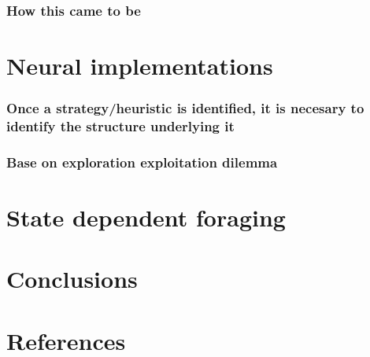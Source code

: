 \documentclass[11pt]{article}
\begin{document}
\subsubsection{How this came to be}
\label{sec:org9a89bb2}
\newpage
\section{Neural implementations}
\label{sec:orgb71928e}
\subsubsection{Once a strategy/heuristic is identified, it is necesary to identify the structure underlying it}
\label{sec:org573194f}
\subsubsection{Base on exploration exploitation dilemma}
\label{sec:org578b7b1}
\newpage
\section{State dependent foraging}
\label{sec:org8b9c31a}
\newpage
\section{Conclusions}
\label{sec:org0fab3aa}
\newpage
\section{References}
\label{sec:orgc8af6e9}



\end{document}
